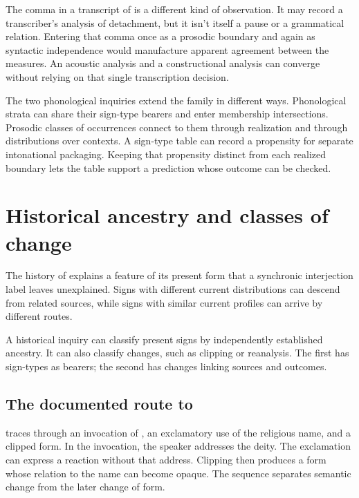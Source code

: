 \documentclass[12pt]{article}
\begin{document}
The comma in a transcript of 
is a different kind of observation. It may record a transcriber's
analysis of detachment, but it isn't itself a pause or a grammatical
relation. Entering that comma once as a prosodic boundary and again
as syntactic independence would manufacture apparent agreement between
the measures. An acoustic analysis and a constructional analysis can
converge without relying on that single transcription decision.

The two phonological inquiries extend the family in different ways. Phonological strata can share their sign-type bearers and
enter membership intersections. Prosodic classes of occurrences connect
to them through realization and through distributions over contexts.
A sign-type table can record a propensity for separate intonational
packaging. Keeping that propensity distinct from each realized boundary
lets the table support a prediction whose outcome can be checked.

\section{Historical ancestry and classes of change}\label{sec:history}

The history of  explains a feature of its present form
that a synchronic interjection label leaves unexplained. Signs with
different current distributions can descend from related sources, while
signs with similar current profiles can arrive by different routes.

A historical inquiry can classify present signs by independently established
ancestry. It can also classify changes, such as clipping or reanalysis.
The first has sign-types as bearers; the second has changes linking
sources and outcomes.

\subsection{The documented route to }

\textcite{gehweiler2008} traces  through an invocation of ,
an exclamatory use of the religious name, and a clipped form. In the invocation, the speaker addresses the deity.
The exclamation can express a reaction without that address. Clipping
then produces a form whose relation to the name can become opaque.
The sequence separates semantic change from the later change of form.
\end{document}
